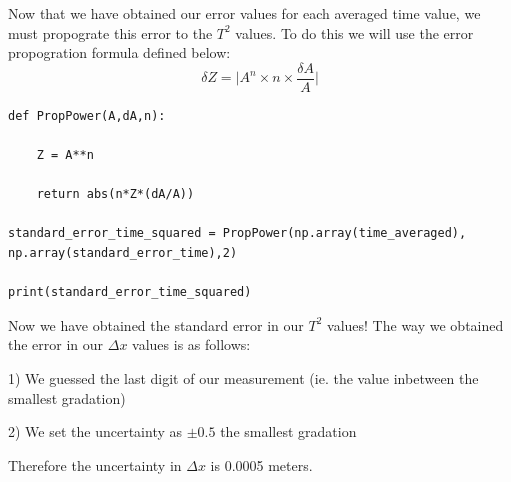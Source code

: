 \documentclass[12pt]{article}
\begin{document}
	
\medskip

Now that we have obtained our error values for each averaged time value, we must propograte this error to the $T^2$ values. To do this we will use the error propogration formula defined below: $$\delta Z = \lvert A^n \times n \times \frac{\delta A}{A}\rvert$$

\bigskip
 
\begin{lstlisting}[frame=shadowbox]
def PropPower(A,dA,n):

	Z = A**n

	return abs(n*Z*(dA/A))

standard_error_time_squared = PropPower(np.array(time_averaged), np.array(standard_error_time),2)

print(standard_error_time_squared)
\end{lstlisting}
	
\medskip

Now we have obtained the standard error in our $T^2$ values! The way we obtained the error in our $\Delta x$ values is as follows:

1) We guessed the last digit of our measurement (ie. the value inbetween the smallest gradation)

2) We set the uncertainty as $\pm 0.5$ the smallest gradation


Therefore the uncertainty in $\Delta x$ is 0.0005 meters.

\bigskip
 
\end{document}
